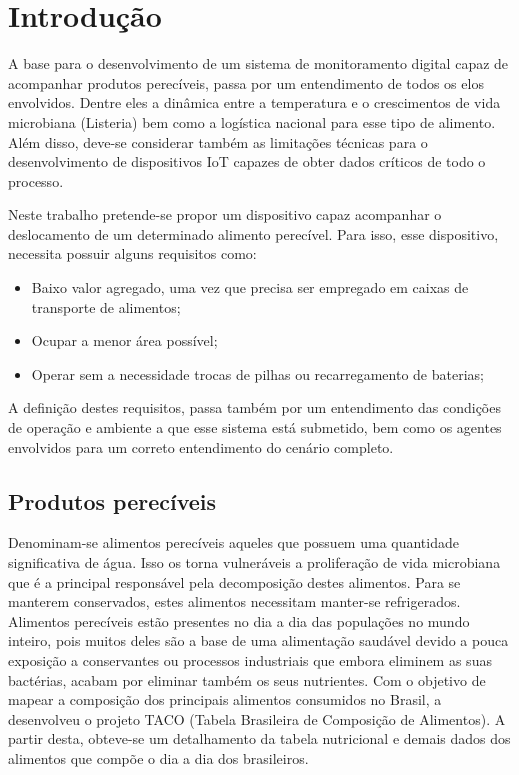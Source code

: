 \chapter{Introdução}\label{cap:introducao}

A base para o desenvolvimento de um sistema de monitoramento digital capaz de acompanhar produtos perecíveis, passa por um entendimento de todos os elos envolvidos. Dentre eles a dinâmica entre a temperatura e o crescimentos de vida microbiana (Listeria) bem como a logística nacional para esse tipo de alimento. Além disso, deve-se considerar também as limitações técnicas para o desenvolvimento de dispositivos IoT capazes de obter dados críticos de todo o processo.

Neste trabalho pretende-se propor um dispositivo capaz acompanhar o deslocamento de um determinado alimento perecível. Para isso, esse dispositivo, necessita possuir alguns requisitos como:
\begin{itemize}
    \item Baixo valor agregado, uma vez que precisa ser empregado em caixas de transporte de alimentos;
    \item Ocupar a menor área possível;
    \item Operar sem a necessidade trocas de pilhas ou recarregamento de baterias;
\end{itemize}

A definição destes requisitos, passa também por um entendimento das condições de operação e ambiente a que esse sistema está submetido, bem como os agentes envolvidos para um correto entendimento do cenário completo.
\section{Produtos perecíveis}
Denominam-se alimentos perecíveis aqueles que possuem uma quantidade significativa de água. Isso os torna vulneráveis a proliferação de vida microbiana que é a principal responsável pela decomposição destes alimentos. Para se manterem conservados, estes alimentos necessitam manter-se refrigerados.
Alimentos perecíveis estão presentes no dia a dia das populações no mundo inteiro, pois muitos deles são a base de uma alimentação saudável devido a pouca exposição a conservantes ou processos industriais que embora eliminem as suas bactérias, acabam por eliminar também os seus nutrientes.
Com o objetivo de mapear a composição dos principais alimentos consumidos no Brasil, a  desenvolveu o projeto TACO (Tabela Brasileira de Composição de Alimentos). A partir desta, obteve-se um detalhamento da tabela nutricional e demais dados dos alimentos que compõe o dia a dia dos brasileiros.

